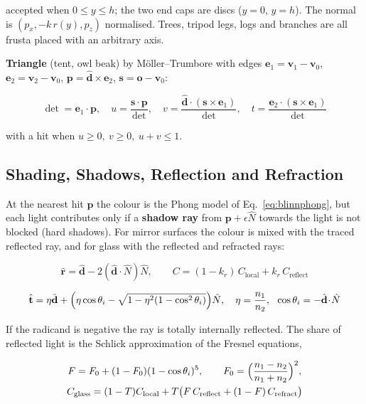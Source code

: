 \documentclass[12pt,a4paper]{report}
\begin{document}
accepted when $0\le y\le h$; the two end caps are discs ($y=0$, $y=h$). The normal is $(p_x,-k\,r(y),p_z)$ normalised. Trees, tripod legs, logs and branches are all frusta placed with an arbitrary axis.

\textbf{Triangle} (tent, owl beak) by M\"oller--Trumbore with edges $\mathbf{e}_1=\mathbf{v}_1-\mathbf{v}_0$, $\mathbf{e}_2=\mathbf{v}_2-\mathbf{v}_0$, $\mathbf{p}=\hat{\mathbf{d}}\times\mathbf{e}_2$, $\mathbf{s}=\mathbf{o}-\mathbf{v}_0$:

\begin{equation}
\det=\mathbf{e}_1\!\cdot\!\mathbf{p},\quad u=\frac{\mathbf{s}\!\cdot\!\mathbf{p}}{\det},\quad v=\frac{\hat{\mathbf{d}}\!\cdot\!(\mathbf{s}\times\mathbf{e}_1)}{\det},\quad t=\frac{\mathbf{e}_2\!\cdot\!(\mathbf{s}\times\mathbf{e}_1)}{\det}
\label{eq:mt}
\end{equation}

with a hit when $u\ge0,\ v\ge0,\ u+v\le1$.

\subsection{Shading, Shadows, Reflection and Refraction}

At the nearest hit $\mathbf{p}$ the colour is the Phong model of Eq.~\ref{eq:blinnphong}, but each light contributes only if a \textbf{shadow ray} from $\mathbf{p}+\epsilon\hat{N}$ towards the light is not blocked (hard shadows). For mirror surfaces the colour is mixed with the traced reflected ray, and for glass with the reflected and refracted rays:

\begin{equation}
\hat{\mathbf{r}}=\hat{\mathbf{d}}-2(\hat{\mathbf{d}}\!\cdot\!\hat{N})\hat{N},\qquad
C=(1-k_r)\,C_{\text{local}}+k_r\,C_{\text{reflect}}
\label{eq:rtreflect}
\end{equation}

\begin{equation}
\hat{\mathbf{t}}=\eta\hat{\mathbf{d}}+\Bigl(\eta\cos\theta_i-\sqrt{1-\eta^2(1-\cos^2\theta_i)}\Bigr)\hat{N},\quad \eta=\frac{n_1}{n_2},\ \ \cos\theta_i=-\hat{\mathbf{d}}\!\cdot\!\hat{N}
\label{eq:snell}
\end{equation}

If the radicand is negative the ray is totally internally reflected. The share of reflected light is the Schlick approximation of the Fresnel equations,

\begin{equation}
\begin{gathered}
F=F_0+(1-F_0)(1-\cos\theta_i)^5,\qquad F_0=\Bigl(\frac{n_1-n_2}{n_1+n_2}\Bigr)^2,\\
C_{\text{glass}}=(1-T)C_{\text{local}}+T\bigl(F\,C_{\text{reflect}}+(1-F)\,C_{\text{refract}}\bigr)
\end{gathered}
\label{eq:schlick}
\end{equation}
\end{document}
